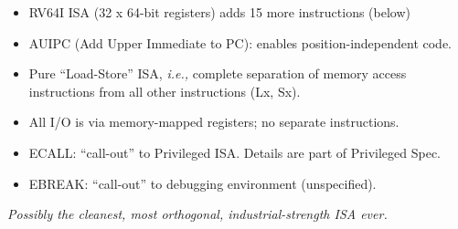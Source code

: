 \documentclass{article}
\newcommand{\ie}{\emph{i.e.,}}
\begin{document}
\begin{center}
\begin{minipage}[t]{5in}
\begin{itemize}
  \item RV64I ISA (32 x 64-bit registers) adds 15 more instructions
    (below)

  \end{itemize}

  \vspace{0.1in}


  \begin{itemize}\large

  \item AUIPC (Add Upper Immediate to PC): enables position-independent code.

  \item Pure ``Load-Store'' ISA, {\ie} complete separation of memory
    access instructions from all other instructions (Lx, Sx).

  \item All I/O is via memory-mapped registers; no separate instructions.

  \item ECALL: ``call-out'' to Privileged ISA.  Details are part of
    Privileged Spec.

  \item EBREAK: ``call-out'' to debugging environment (unspecified).

  \end{itemize}
  {\large \emph{Possibly the cleanest, most orthogonal, industrial-strength ISA ever.}}
\end{minipage}

\end{center}

\clearpage

\end{document}
